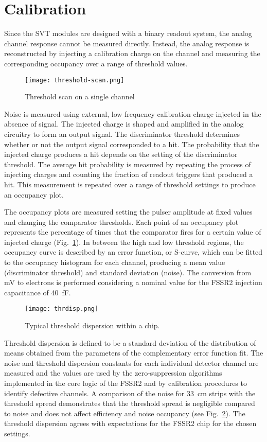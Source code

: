 \section{Calibration}

Since the SVT modules are designed with a binary readout system, the analog channel response cannot be measured directly. Instead, the analog response is reconstructed by injecting a calibration charge on the channel and measuring the corresponding occupancy over a range of threshold values. 

\begin{figure}[hbt] 
	\centering 
	\texttt{[image: threshold-scan.png]}
	\caption{Threshold scan on a single channel}
	\label{fig:threshold-scan}
\end{figure}

Noise is measured using external, low frequency calibration charge injected in the absence of signal. The injected charge is shaped and amplified in the analog circuitry to form an output signal. The discriminator threshold determines whether or not the output signal corresponded to a hit. The probability that the injected charge produces a hit depends on the setting of the discriminator threshold. The average hit probability is measured by repeating the process of injecting charges and counting the fraction of readout triggers that produced a hit. This measurement is repeated over a range of threshold settings to produce an occupancy plot. 

The occupancy plots are measured setting the pulser amplitude at fixed values and changing the comparator thresholds. Each point of an occupancy plot represents the percentage of times that the comparator fires for a certain value of injected charge (Fig.~\ref{fig:threshold-scan}). In between the high and low threshold regions, the occupancy curve is described by an error function, or S-curve, which can be fitted to the occupancy histogram for each channel, producing a mean value (discriminator threshold) and standard deviation (noise). The conversion from mV to electrons is performed considering a nominal value for the FSSR2 injection capacitance of 40~fF. 

\begin{figure}[hbt] 
	\centering 
	\texttt{[image: thrdisp.png]}
	\caption{Typical threshold dispersion within a chip.}
	\label{fig:thrdisp}
\end{figure}

Threshold dispersion is defined to be a standard deviation of the distribution of means obtained from the parameters of the complementary error function fit. The noise and threshold dispersion constants for each individual detector channel are measured and the values are used by the zero-suppression algorithms implemented in the core logic of the FSSR2 and by calibration procedures to identify defective channels. A comparison of the noise for 33~cm strips with the threshold spread demonstrates that the threshold spread is negligible compared to noise and does not affect efficiency and noise occupancy (see Fig.~\ref{fig:thrdisp}). The threshold dispersion agrees with expectations for the FSSR2 chip for the chosen settings.

